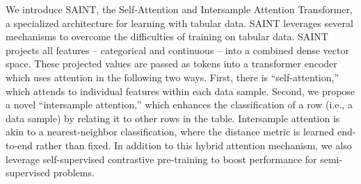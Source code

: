 \documentclass{article}
\newcommand{\bayan}[1]{\textcolor{cyan}{#1}}
\newcommand{\tom}[1]{\textcolor{green}{#1}}
\begin{document}



We introduce SAINT, the Self-Attention and Intersample Attention Transformer, a specialized architecture for learning with tabular data. SAINT leverages several mechanisms to overcome the difficulties of training on tabular data. SAINT projects all features -- categorical and continuous -- into a combined dense vector space. These projected values are passed as tokens into a transformer encoder which uses attention in the following two ways. First, there is ``self-attention,'' which attends to individual features within each data sample. Second, we propose a novel ``intersample attention,'' which enhances the classification of a row (i.e., a data sample) by relating it to other rows in the table.  Intersample attention is akin to a nearest-neighbor classification, where the distance metric is learned end-to-end rather than fixed. In addition to this hybrid attention mechanism, we also leverage self-supervised contrastive pre-training to boost performance for semi-supervised problems.  
\end{document}
